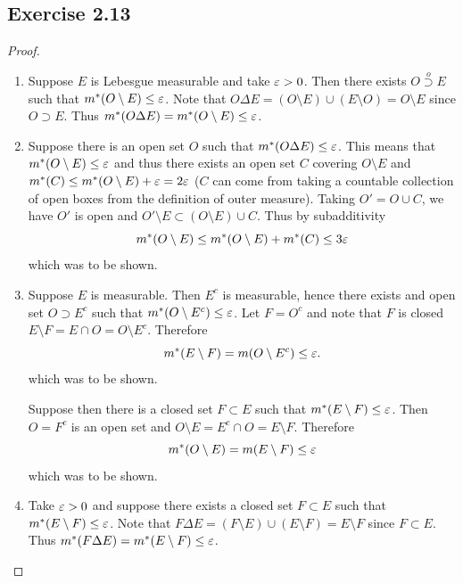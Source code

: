 \documentclass[hw_all.tex]{subfiles}
\begin{document}
\subsection{Exercise 2.13}

\begin{proof}
    \begin{enumerate}
        \item[i $\Rightarrow$ ii)]
            Suppose $E$ is Lebesgue measurable and take $\varepsilon > 0$. Then there exists $O \overset{o}{\supset} E$ such that $m^*(O \setminus E) \leq \varepsilon$. Note that $O \Delta E = (O \setminus E) \cup (E \setminus O) = O \setminus E$ since $O \supset E$. Thus $m^*(O \Delta E) = m^*(O \setminus E) \leq \varepsilon$.

        \item[ii $\Rightarrow$ i)]
            Suppose there is an open set $O$ such that $m^*(O \Delta E) \leq \varepsilon$. This means that $m^*(O \setminus E) \leq \varepsilon$ and thus there exists an open set $C$ covering $O \setminus E$ and $m^*(C) \leq m^*(O \setminus E) + \varepsilon = 2 \varepsilon$ ($C$ can come from taking a countable collection of open boxes from the definition of outer measure). Taking $O' = O \cup C$, we have $O'$ is open and $O' \setminus E \subset (O \setminus E) \cup C$. Thus by subadditivity
            \[
                m^*(O \setminus E) \leq m^*(O \setminus E) + m^*(C) \leq 3 \varepsilon
            \]
            which was to be shown.

        \item[i $\Leftrightarrow$ iii)]
            Suppose $E$ is measurable. Then $E^c$ is measurable, hence there exists and open set $O \supset E^c$ such that $m^*(O \setminus E^c) \leq \varepsilon$. Let $F = O^c$ and note that $F$ is closed $E \setminus F = E \cap O = O \setminus E^c$. Therefore
            \[
                m^*(E \setminus F) = m(O \setminus E^c) \leq \varepsilon
            .\]
            which was to be shown.

            Suppose then there is a closed set $F \subset E$ such that $m^*(E \setminus F) \leq \varepsilon$. Then $O = F^c$ is an open set and $O \setminus E = E^c \cap O = E \setminus F$. Therefore
            \[
                m^*(O \setminus E) = m(E \setminus F) \leq \varepsilon
            \]
            which was to be shown.

        \item[iii $\Rightarrow$ iv)]
            Take $\varepsilon > 0$ and suppose there exists a closed set $F \subset E$ such that $m^*(E \setminus F) \leq \varepsilon$. Note that $F \Delta E = (F \setminus E) \cup (E \setminus F) = E \setminus F$ since $F \subset E$. Thus $m^*(F \Delta E) = m^*(E \setminus F) \leq \varepsilon$.


\end{enumerate}
\end{proof}
\end{document}
